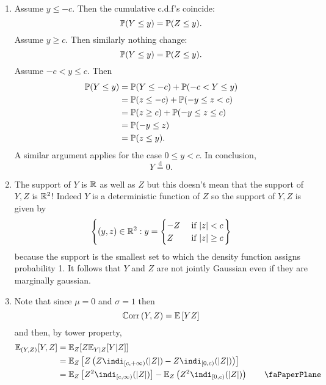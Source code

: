 \begin{enumerate}
	\item Assume $y\leq -c$. Then the cumulative c.d.f's coincide:
	\begin{equation*}
		\mathbb{P}(Y\leq y)=\mathbb{P}(Z\leq y).
	\end{equation*}
	Assume $y\geq c$. Then similarly nothing change:
	\begin{equation*}
		\mathbb{P}(Y\leq y)=\mathbb{P}(Z\leq y).
	\end{equation*}
	Assume $-c<y\leq c$. Then
	\begin{align*}
		\mathbb{P}(Y\leq y)&=\mathbb{P}(Y\leq-c)+\mathbb{P}(-c<Y\leq y)\\
		&=\mathbb{P}(z\leq-c)+\mathbb{P}(-y\leq z<c)\\
		&=\mathbb{P}(z\geq c)+\mathbb{P}(-y\leq z\leq c)\\
		&=\mathbb{P}(-y\leq z)\\
		&=\mathbb{P}(z\leq y).
	\end{align*}
	A similar argument applies for the case $0\leq y<c$. In conclusion, 
	\begin{equation*}
		Y\overset{\text{d}}{=}0.
	\end{equation*}
	\item The support of $Y$ is $\mathbb{R}$ as well as $Z$ but this doesn't mean that the support of $Y,Z$ is $\mathbb{R}^{2}$! Indeed $Y$ is a deterministic function of $Z$ so the support of $Y,Z$ is given by
	\begin{equation*}
		\left\{(y,z)\in\mathbb{R}^{2}:y=\begin{cases}
			-Z&\text{ if }|z|<c\\
			Z&\text{ if }|z|\geq c
		\end{cases}\right\}
	\end{equation*}
	because the support is the smallest set to which the density function assigns probability 1. It follows that $Y$ and $Z$ are not jointly Gaussian even if they are marginally gaussian.
	\item Note that since $\mu=0$ and $\sigma=1$ then 
	\begin{equation*}
		\mathbb{C}\mathrm{orr}\,(Y,Z)=\mathbb{E}\left[YZ\right]
	\end{equation*}
	and then, by tower property,
	\begin{align*}
		\evs_{(Y,Z)}[Y,Z]&=\evs_{Z}[Z\evs_{Y|Z}[Y|Z]]\\
		&=\evs_{Z}\left[Z\left(Z\indi_{[c,+\infty)}(|Z|)-Z\indi_{[0,c)}(|Z|)\right)\right]\\
		&=\evs_{Z}\left[Z^{2}\indi_{[c,\infty)}(|Z|)\right]-\evs_{Z}\left(Z^{2}\indi_{[0,c)}(|Z|)\right)\tag*{\faPaperPlane}\label{pplane}\\

\end{align*}
\end{enumerate}
